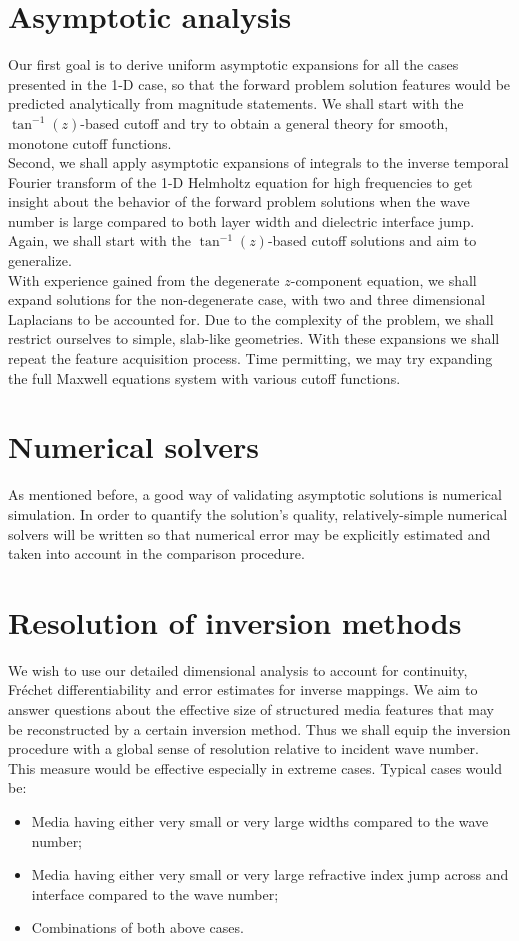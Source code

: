 \documentclass[12pt,twoside]{report}
\begin{document}
\section{Asymptotic analysis}
Our first goal is to derive uniform asymptotic expansions for all the cases presented in the 1-D case, so that the forward problem solution features would be predicted analytically from magnitude statements. We shall start with the $\tan^{-1}(z)$-based cutoff and try to obtain a general theory for smooth, monotone cutoff functions.  \\
Second, we shall apply asymptotic expansions of integrals to the inverse temporal Fourier transform of the 1-D Helmholtz equation for high frequencies to get insight about the behavior of the forward problem solutions when the wave number is large compared to both layer width and dielectric interface jump. Again, we shall start with the $\tan^{-1}(z)$-based cutoff solutions  and aim to generalize. \\
With experience gained from the degenerate $z$-component equation, we shall expand solutions for the non-degenerate case, with two and three dimensional Laplacians to be accounted for. Due to the complexity of the problem, we shall restrict ourselves to simple, slab-like geometries. With these expansions we shall repeat the feature acquisition process. Time permitting, we may try expanding the full Maxwell equations system with various cutoff functions.

\section{Numerical solvers}
As mentioned before, a good way of validating asymptotic solutions is numerical simulation. In order to quantify the solution's quality, relatively-simple numerical solvers will be written so that numerical error may be explicitly estimated and taken into account in the comparison procedure.

\section{Resolution of inversion methods} 
We wish to use our detailed dimensional analysis to account for continuity, Fr\'echet differentiability and error estimates for inverse mappings. We aim to answer questions about the effective size of structured media features that may be reconstructed by a certain inversion method. Thus we shall equip the inversion procedure with a global sense of resolution relative to incident wave number.\\
This measure would be effective especially in extreme cases. Typical cases would be:
\begin{itemize}
\item Media having either very small or very large widths compared to the wave number;
\item Media having either very small or very large refractive index jump across and interface compared to the wave number;
\item Combinations of both above cases.
\end{itemize} 
\end{document}
